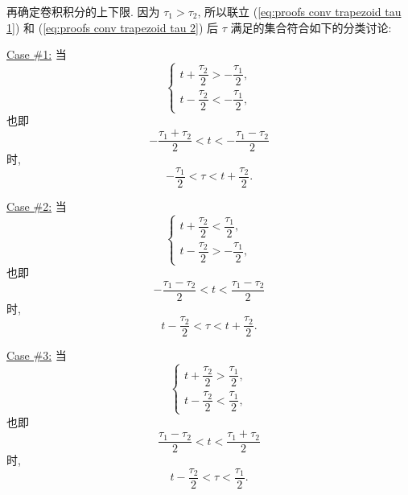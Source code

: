 再确定卷积积分的上下限. 因为 $\tau_1>\tau_2$, 所以联立 (\ref{eq:proofs conv trapezoid tau 1}) 和 (\ref{eq:proofs conv trapezoid tau 2}) 后 $\tau$ 满足的集合符合如下的分类讨论:

\underline{Case \#1:} 当
\begin{equation*}
    \begin{cases}
        t+\dfrac{\tau_2}{2}>-\dfrac{\tau_1}{2}, \\
        t-\dfrac{\tau_2}{2}<-\dfrac{\tau_1}{2},
    \end{cases}
\end{equation*}
也即
\begin{equation}
    -\frac{\tau_1+\tau_2}{2}<t<-\frac{\tau_1-\tau_2}{2}
\end{equation}
时,
\begin{equation}
    -\frac{\tau_1}{2}<\tau<t+\frac{\tau_2}{2}.
\end{equation}

\underline{Case \#2:} 当
\begin{equation*}
    \begin{cases}
        t+\dfrac{\tau_2}{2}<\dfrac{\tau_1}{2}, \\
        t-\dfrac{\tau_2}{2}>-\dfrac{\tau_1}{2},
    \end{cases}
\end{equation*}
也即
\begin{equation}
    -\frac{\tau_1-\tau_2}{2}<t<\frac{\tau_1-\tau_2}{2}
\end{equation}
时,
\begin{equation}
    t-\frac{\tau_2}{2}<\tau<t+\frac{\tau_2}{2}.
\end{equation}

\underline{Case \#3:} 当
\begin{equation*}
    \begin{cases}
        t+\dfrac{\tau_2}{2}>\dfrac{\tau_1}{2}, \\
        t-\dfrac{\tau_2}{2}<\dfrac{\tau_1}{2},
    \end{cases}
\end{equation*}
也即
\begin{equation}
    \frac{\tau_1-\tau_2}{2}<t<\frac{\tau_1+\tau_2}{2}
\end{equation}
时,
\begin{equation}
    t-\frac{\tau_2}{2}<\tau<\frac{\tau_1}{2}.
\end{equation}

